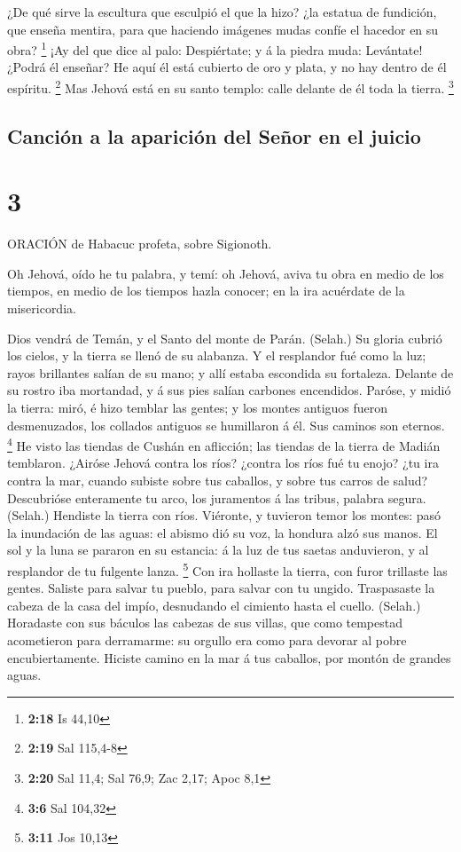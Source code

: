 ¿De qué sirve la escultura que esculpió el que la hizo?
¿la estatua de fundición, que enseña mentira, para que haciendo imágenes
mudas confíe el hacedor en su obra? \footnote{\textbf{2:18} Is 44,10}
 ¡Ay del que dice al palo: Despiértate; y á la piedra muda:
Levántate! ¿Podrá él enseñar? He aquí él está cubierto de oro y plata, y
no hay dentro de él espíritu. \footnote{\textbf{2:19} Sal 115,4-8}
 Mas Jehová está en su santo templo: calle delante de él
toda la tierra. \footnote{\textbf{2:20} Sal 11,4; Sal 76,9; Zac 2,17;
  Apoc 8,1}

\hypertarget{canciuxf3n-a-la-apariciuxf3n-del-seuxf1or-en-el-juicio}{%
\subsection{Canción a la aparición del Señor en el
juicio}\label{canciuxf3n-a-la-apariciuxf3n-del-seuxf1or-en-el-juicio}}

\hypertarget{section-2}{%
\section{3}\label{section-2}}

 ORACIÓN de Habacuc profeta, sobre Sigionoth.

 Oh Jehová, oído he tu palabra, y temí: oh Jehová, aviva tu
obra en medio de los tiempos, en medio de los tiempos hazla conocer; en
la ira acuérdate de la misericordia.

 Dios vendrá de Temán, y el Santo del monte de Parán.
(Selah.) Su gloria cubrió los cielos, y la tierra se llenó de su
alabanza.  Y el resplandor fué como la luz; rayos brillantes
salían de su mano; y allí estaba escondida su fortaleza. 
Delante de su rostro iba mortandad, y á sus pies salían carbones
encendidos.  Paróse, y midió la tierra: miró, é hizo temblar
las gentes; y los montes antiguos fueron desmenuzados, los collados
antiguos se humillaron á él. Sus caminos son eternos. \footnote{\textbf{3:6}
  Sal 104,32}  He visto las tiendas de Cushán en aflicción;
las tiendas de la tierra de Madián temblaron.  ¿Airóse
Jehová contra los ríos? ¿contra los ríos fué tu enojo? ¿tu ira contra la
mar, cuando subiste sobre tus caballos, y sobre tus carros de salud?
 Descubrióse enteramente tu arco, los juramentos á las
tribus, palabra segura. (Selah.) Hendiste la tierra con ríos.
 Viéronte, y tuvieron temor los montes: pasó la inundación
de las aguas: el abismo dió su voz, la hondura alzó sus manos.
 El sol y la luna se pararon en su estancia: á la luz de
tus saetas anduvieron, y al resplandor de tu fulgente lanza. \footnote{\textbf{3:11}
  Jos 10,13}  Con ira hollaste la tierra, con furor
trillaste las gentes.  Saliste para salvar tu pueblo, para
salvar con tu ungido. Traspasaste la cabeza de la casa del impío,
desnudando el cimiento hasta el cuello. (Selah.)  Horadaste
con sus báculos las cabezas de sus villas, que como tempestad
acometieron para derramarme: su orgullo era como para devorar al pobre
encubiertamente.  Hiciste camino en la mar á tus caballos,
por montón de grandes aguas.

